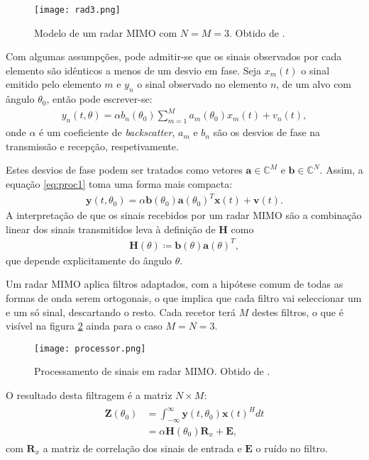 \documentclass[purist,portuguese]{ist-report}
\begin{document}
\begin{figure}[hp]
  \centering
  \texttt{[image: rad3.png]}
  \caption{Modelo de um radar MIMO com $N=M=3$. Obtido de \cite{davis2015mimo}.}
  \label{fig:rad3}
\end{figure}

Com algumas assumpções, pode admitir-se que os sinais observados por cada elemento são idênticos a menos de um desvio em fase.
Seja $x_m(t)$ o sinal emitido pelo elemento $m$ e $y_n$ o sinal observado no elemento $n$, de um alvo com ângulo $\theta_0$, então pode escrever-se:
\begin{align}
  y_n(t,\theta) = \alpha b_n(\theta_0) \sum_{m=1}^{M}a_m(\theta_0)x_m(t) + v_n(t),
  \label{eq:proc1}
\end{align}
onde $\alpha$ é um coeficiente de \textit{backscatter}, $a_m$ e $b_n$ são os desvios de fase na transmissão e recepção, respetivamente.

Estes desvios de fase podem ser tratados como vetores $\mathbf{a} \in \mathbb{C}^M$ e $\mathbf{b} \in \mathbb{C}^N$.
Assim, a equação \ref{eq:proc1} toma uma forma mais compacta:
\begin{align}
  \mathbf{y}(t,\theta_0) = \alpha\mathbf{b}(\theta_0)\mathbf{a}(\theta_0)^T\mathbf{x}(t)+\mathbf{v}(t).
  \label{eq:radc}
\end{align}
A interpretação de que os sinais recebidos por um radar MIMO são a combinação linear dos sinais transmitidos leva à definição de $\mathbf{H}$ como
\begin{align}
  \mathbf{H}(\theta) \coloneqq \mathbf{b}(\theta)\mathbf{a}(\theta)^T,
  \label{eq:H}
\end{align}
que depende explicitamente do ângulo $\theta$.

Um radar MIMO aplica filtros adaptados, com a hipótese comum de todas as formas de onda serem ortogonais, o que implica que cada filtro vai seleccionar um e um só sinal, descartando o resto.
Cada recetor terá $M$ destes filtros, o que é visível na figura \ref{fig:proc} ainda para o caso $M=N=3$.

\begin{figure}[ht]
  \centering
  \texttt{[image: processor.png]}
  \caption{Processamento de sinais em radar MIMO. Obtido de \cite{davis2015mimo}.}
  \label{fig:proc}
\end{figure}

O resultado desta filtragem é a matriz $N\times M$:
\begin{align}
  \begin{aligned}
    \mathbf{Z}(\theta_0) &= \int_{-\infty}^{\infty} \mathbf{y}(t,\theta_0)\mathbf{x}(t)^Hdt \\
	&= \alpha \mathbf{H}(\theta_0)\mathbf{R}_x + \mathbf{E} ,
  \end{aligned}
  \label{eq:Z}
\end{align}
com $\mathbf{R}_x$ a matriz de correlação dos sinais de entrada e $\mathbf{E}$ o ruído no filtro.
\end{document}
